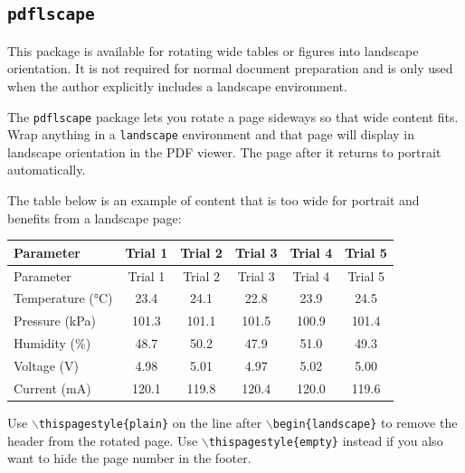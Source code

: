 	\begin{landscape} 	  %
	\thispagestyle{plain} %
	\subsection{\texttt{pdflscape}}
	\noindent\colorbox{themecolour!15}{\parbox{\linewidth}{\small This package is available for rotating wide tables or figures into landscape orientation. It is not required for normal document preparation and is only used when the author explicitly includes a landscape environment.}}\vspace{0.5\baselineskip}
	
	The \texttt{pdflscape} package lets you rotate a page sideways so that wide content fits. Wrap anything in a \texttt{landscape} environment and that page will display in landscape orientation in the PDF viewer. The page after it returns to portrait automatically.
	
	The table below is an example of content that is too wide for portrait and benefits from a landscape page:
	
	\begin{tabularx}{\linewidth}{@{}LCCCCC@{}}
		\caption{Wide data table spanning landscape page.}
		\label{tab:landscape} \\
		\toprule
		Parameter & Trial 1 & Trial 2 & Trial 3 & Trial 4 & Trial 5 \\
		\midrule
		\endfirsthead
		\toprule
		Parameter & Trial 1 & Trial 2 & Trial 3 & Trial 4 & Trial 5 \\
		\midrule
		\endhead
		\bottomrule
		\endfoot
		\bottomrule
		\endlastfoot
		Temperature (\si{\celsius})     & 23.4 & 24.1 & 22.8 & 23.9 & 24.5 \\
		
		Pressure (\si{\kilo\pascal})  & 101.3 & 101.1 & 101.5 & 100.9 & 101.4 \\
		
		Humidity (\%)               & 48.7 & 50.2 & 47.9 & 51.0 & 49.3 \\
		
		Voltage (\si{\volt})          & 4.98 & 5.01 & 4.97 & 5.02 & 5.00 \\
		
		Current (\si{\milli\ampere}) & 120.1 & 119.8 & 120.4 & 120.0 & 119.6 \\
	\end{tabularx}
	
	Use \texttt{$\backslash$thispagestyle\{plain\}} on the line after \texttt{$\backslash$begin\{landscape\}} to remove the header from the rotated page. Use \texttt{$\backslash$thispagestyle\{empty\}} instead if you also want to hide the page number in the footer.
	\end{landscape} %

